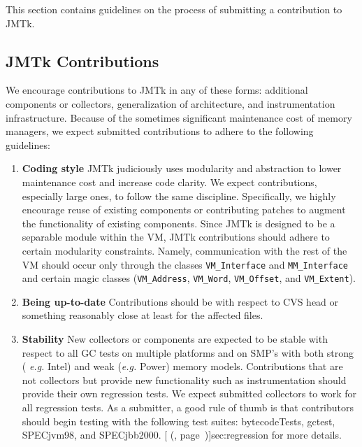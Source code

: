 This section contains guidelines on the process of
submitting a contribution to JMTk.


\subsection{JMTk Contributions}

We encourage contributions to JMTk in any of these forms: additional
components or collectors, generalization of architecture,
and instrumentation infrastructure.  Because of the sometimes significant
maintenance cost of memory managers, we expect submitted contributions
to adhere to the following guidelines:


\begin{enumerate}

\item {\bf Coding style}  
JMTk judiciously uses modularity and abstraction to lower maintenance
cost and increase code clarity.  We expect contributions, especially
large ones, to follow the same discipline.  Specifically, we highly
encourage reuse of existing components or contributing patches to
augment the functionality of existing components.  Since JMTk is
designed to be a separable module within the VM, JMTk contributions
should adhere to certain modularity constraints.  Namely,
communication with the rest of the VM should occur only through the
classes {\tt VM\_Interface} and {\tt MM\_Interface} and certain magic classes
({\tt VM\_Address}, {\tt VM\_Word}, {\tt VM\_Offset}, and {\tt VM\_Extent}).

\item {\bf Being up-to-date}  
Contributions should be with respect to CVS head or something
reasonably close at least for the affected files.

\item { \bf Stability}  
New collectors or components are expected to be stable with respect to
all GC tests on multiple platforms and on SMP's with both strong ({\it
e.g.} Intel\Rweb{}) and weak ({\it e.g.} Power) memory models.  Contributions
that are not collectors but provide new functionality such as
instrumentation should provide their own regression tests.
We expect submitted collectors to work for all regression tests.
As a submitter, a good rule of thumb is that contributors should begin
testing with the following test suites: bytecodeTests, gctest, 
SPECjvm\Rweb{}98, and SPECjbb\Rweb{}2000.  [ (\Ref,
page~\Pageref)]{sec:regression} for more details. 


\end{enumerate}
